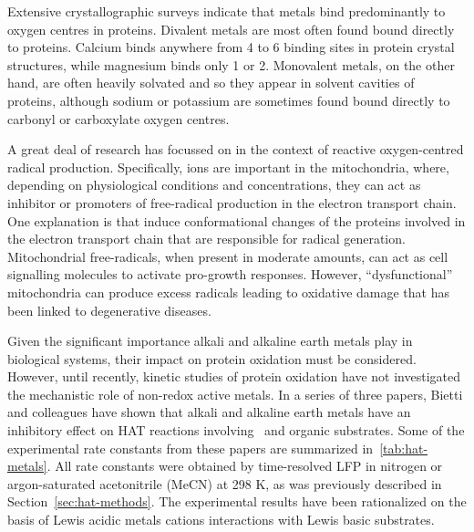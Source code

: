 Extensive crystallographic surveys indicate that metals bind predominantly to
oxygen centres in proteins.\cite{Harding1999, Harding2004, Hsin2008} Divalent
metals are most often found bound directly to proteins. Calcium binds anywhere
from 4 to 6 binding sites in protein crystal structures, while magnesium binds
only 1 or 2. Monovalent metals, on the other hand, are often heavily solvated
and so they appear in solvent cavities of proteins, although sodium or potassium
are sometimes found bound directly to carbonyl or carboxylate oxygen
centres.\cite{Harding2010}

A great deal of research has focussed on  in the context of reactive
oxygen-centred radical production.\cite{Goerlach2015} Specifically, 
ions are important in the mitochondria, where, depending on physiological
conditions and concentrations, they can act as inhibitor or promoters of
free-radical production in the electron transport chain.\cite{AdamVizi2010} One
explanation is that  induce conformational changes of the proteins
involved in the electron transport chain that are responsible for radical
generation.\cite{Brookes2004} Mitochondrial free-radicals, when present in
moderate amounts, can act as cell signalling molecules to activate pro-growth
responses.\cite{Sullivan2014} However, ``dysfunctional'' mitochondria can
produce excess radicals leading to oxidative damage that has been linked to
degenerative diseases.

Given the significant importance alkali and alkaline earth metals play in
biological systems, their impact on protein oxidation must be considered.
However, until recently, kinetic studies of protein oxidation have not
investigated the mechanistic role of non-redox active metals. In a series of
three papers,\cite{Salamone2013a, Salamone2015metals, Salamone2016} Bietti and
colleagues have shown that alkali and alkaline earth metals have an inhibitory
effect on HAT reactions involving \cumo\ and organic substrates. Some of the
experimental rate constants from these papers are summarized
in~\ref{tab:hat-metals}. All rate constants were obtained by time-resolved LFP
in nitrogen or argon-saturated acetonitrile (MeCN) at 298 K, as was previously
described in Section~\ref{sec:hat-methods}. The experimental results have been
rationalized on the basis of Lewis acidic metals cations interactions with Lewis
basic substrates.


